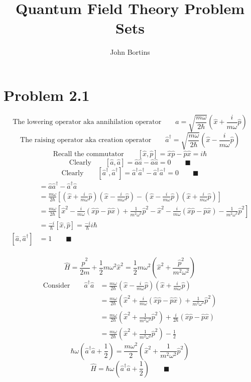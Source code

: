 \documentclass{amsart}
\title{Quantum Field Theory Problem Sets}
\author{John Bortins}
\begin{document}
 
\maketitle{}
 
\section*{Problem 2.1}

\[\text{The lowering operator aka annihilation operator}\qquad\hat{a}  = \sqrt{\frac{m\omega}{2\hbar}}\left(\hat{x} + \frac{i}{m\omega}\hat{p}\right)  \]
\[\text{The raising operator aka creation operator}\qquad\hat{a}^\dagger  = \sqrt{\frac{m\omega}{2\hbar}}\left(\hat{x} - \frac{i}{m\omega}\hat{p}\right)  \]
\[\text{Recall the commutator}\qquad[\hat{x},\hat{p}]  = \hat{x}\hat{p}-\hat{p}\hat{x}=i\hbar \]
\[\text{Clearly}\qquad [\hat{a},\hat{a}]  = \hat{a}\hat{a}-\hat{a}\hat{a}=0 \qquad \blacksquare \]
\[\text{Clearly}\qquad [\hat{a}^\dagger,\hat{a}^\dagger]  = \hat{a}^\dagger\hat{a}^\dagger-\hat{a}^\dagger\hat{a}^\dagger=0 \qquad \blacksquare \]
\begin{align*}
    [\hat{a},\hat{a}^\dagger] &= \hat{a}\hat{a}^\dagger-\hat{a}^\dagger\hat{a}\\
    &= \frac{m\omega}{2\hbar}\left[\left(\hat{x} + \frac{i}{m\omega}\hat{p}\right)\left(\hat{x} - \frac{i}{m\omega}\hat{p}\right)-\left(\hat{x} - \frac{i}{m\omega}\hat{p}\right)\left(\hat{x} + \frac{i}{m\omega}\hat{p}\right)\right]\\
    &= \frac{m\omega}{2\hbar}\left[\hat{x}^2 - \frac{i}{m\omega}(\hat{x}\hat{p}-\hat{p}\hat{x}) + \frac{1}{m^2\omega^2}\hat{p}^2-\hat{x}^2 - \frac{i}{m\omega}(\hat{x}\hat{p}-\hat{p}\hat{x}) - \frac{1}{m^2\omega^2}\hat{p}^2\right]\\
    &= \frac{-i}{\hbar}\left[ \hat{x},\hat{p}\right]= \frac{-i}{\hbar} i\hbar\\
    [\hat{a},\hat{a}^\dagger] &=1 \qquad\blacksquare\\
\end{align*}

\[\hat{H}=\frac{\hat{p}^2}{2m}+\frac{1}{2}m\omega^2\hat{x}^2=\frac{1}{2}m\omega^2\left(\hat{x}^2+\frac{\hat{p}^2}{m^2\omega^2}\right) \]
\begin{align*}
    \text{Consider}\qquad \hat{a}^\dagger \hat{a} &=\frac{m\omega}{2\hbar}\left(\hat{x} - \frac{i}{m\omega}\hat{p}\right)\left(\hat{x} + \frac{i}{m\omega}\hat{p}\right)\\
    &=\frac{m\omega}{2\hbar}\left(\hat{x}^2 + \frac{i}{m\omega}(\hat{x}\hat{p}-\hat{p}\hat{x}) + \frac{1}{m^2\omega^2}\hat{p}^2\right)\\
    &=\frac{m\omega}{2\hbar}\left(\hat{x}^2 + \frac{1}{m^2\omega^2}\hat{p}^2\right) + \frac{i}{2\hbar}(\hat{x}\hat{p}-\hat{p}\hat{x})\\
    &=\frac{m\omega}{2\hbar}\left(\hat{x}^2 + \frac{1}{m^2\omega^2}\hat{p}^2\right) - \frac{1}{2}
\end{align*}
\[\hbar\omega\left(\hat{a}^\dagger \hat{a} +\frac{1}{2}\right)=\frac{m\omega^2}{2}\left(\hat{x}^2 + \frac{1}{m^2\omega^2}\hat{p}^2\right)   \]
\[\hat{H}=\hbar\omega\left(\hat{a}^\dagger \hat{a} +\frac{1}{2}\right)\qquad\blacksquare \]
\end{document}
